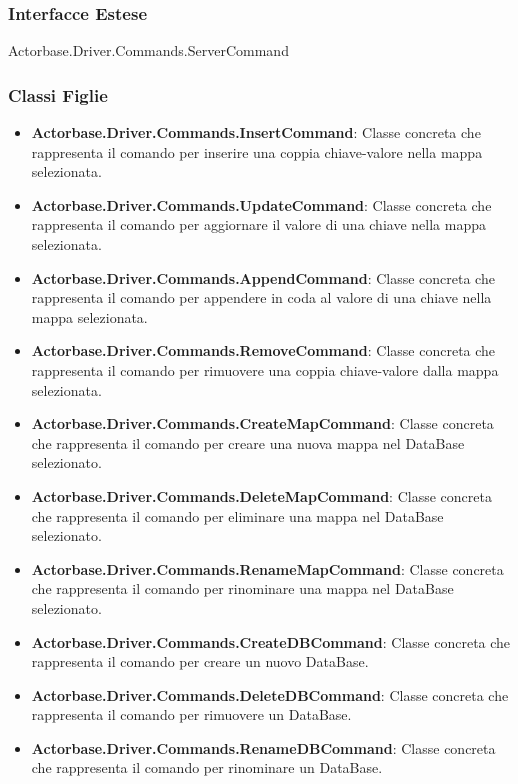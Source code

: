 \documentclass[a4paper]{article}
\begin{document}
			\subsubsection{Interfacce Estese} Actorbase.Driver.Commands.ServerCommand
			\subsubsection{Classi Figlie}
				\begin{itemize}
					\item \textbf{Actorbase.Driver.Commands.InsertCommand}:
						Classe concreta che rappresenta il comando per inserire una coppia chiave-valore nella mappa selezionata.
					\item \textbf{Actorbase.Driver.Commands.UpdateCommand}:
						Classe concreta che rappresenta il comando per aggiornare il valore di una chiave nella mappa selezionata.
					\item \textbf{Actorbase.Driver.Commands.AppendCommand}:
						Classe concreta che rappresenta il comando per appendere in coda al valore di una chiave nella mappa selezionata.
					\item \textbf{Actorbase.Driver.Commands.RemoveCommand}:
						Classe concreta che rappresenta il comando per rimuovere una coppia chiave-valore dalla mappa selezionata.
					\item \textbf{Actorbase.Driver.Commands.CreateMapCommand}:
						Classe concreta che rappresenta il comando per creare una nuova mappa nel DataBase selezionato.
					\item \textbf{Actorbase.Driver.Commands.DeleteMapCommand}:
						Classe concreta che rappresenta il comando per eliminare una mappa nel DataBase selezionato.
					\item \textbf{Actorbase.Driver.Commands.RenameMapCommand}:
						Classe concreta che rappresenta il comando per rinominare una mappa nel DataBase selezionato.
					\item \textbf{Actorbase.Driver.Commands.CreateDBCommand}:
						Classe concreta che rappresenta il comando per creare un nuovo DataBase.
					\item \textbf{Actorbase.Driver.Commands.DeleteDBCommand}:
						Classe concreta che rappresenta il comando per rimuovere un DataBase.
					\item \textbf{Actorbase.Driver.Commands.RenameDBCommand}:
						Classe concreta che rappresenta il comando per rinominare un DataBase.
				\end{itemize}
\end{document}

